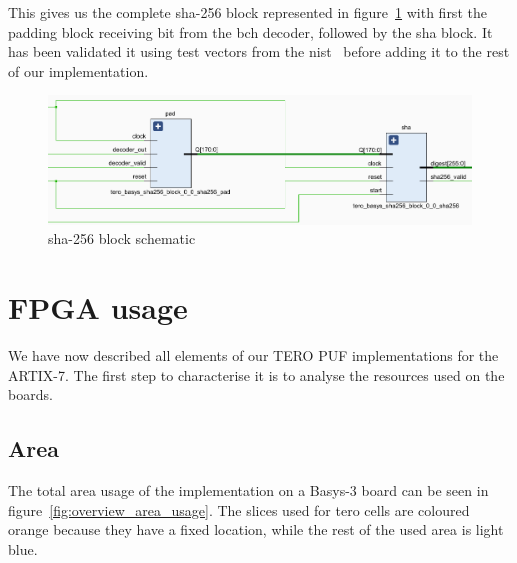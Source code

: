 This gives us the complete \acrshort{sha}-256 block represented in figure~\ref{fig:sha_schematic} with first the padding block receiving bit from the \acrshort{bch} decoder, followed by the \acrshort{sha} block. It has been validated it using test vectors from the \acrfull{nist}~\cite{computer_security_division_example_2016} before adding it to the rest of our implementation.\\

\begin{figure}[H]
    \centering
    \includegraphics[width=\linewidth]{images/sha256_schematic.png}
    \caption{\acrshort{sha}-256 block schematic}
    \label{fig:sha_schematic}
\end{figure}

\section{FPGA usage}
\label{sec:fpga_usage}

We have now described all elements of our TERO PUF implementations for the ARTIX-7. The first step to characterise it is to analyse the resources used on the boards.

\subsection{Area}
\label{subsec:fpga_usage_area}

The total area usage of the implementation on a Basys-3 board can be seen in figure~\ref{fig:overview_area_usage}. The slices used for \acrshort{tero} cells are coloured orange because they have a fixed location, while the rest of the used area is light blue.

